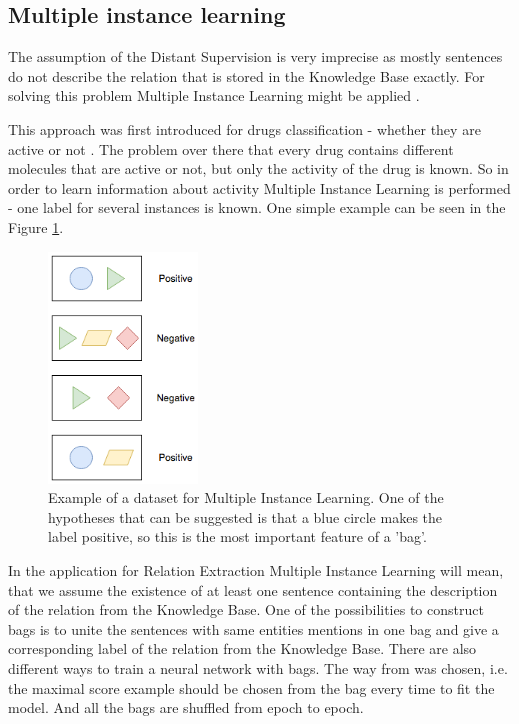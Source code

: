 \subsection{Multiple instance learning}
\label{subs:mil}
The assumption of the Distant Supervision is very imprecise as mostly sentences do not 
describe the relation that is stored in the Knowledge Base exactly. For solving this problem Multiple Instance Learning might be applied \cite{zeng2015distant}. 

This approach was first introduced for drugs classification - whether they are active or not 
\cite{dietterich1997solving}. The problem over there that every drug contains different 
molecules that are active or not, but only the activity of the drug is known. So in order to learn 
information about activity Multiple Instance Learning is performed - one label for several instances is 
known. One simple example can be seen in the Figure \ref{fig:mult-inst-learn}.

	\begin{figure}
		\centering
		\includegraphics[width=150px]{chapter3_approach/images/mult-inst-learn.png}
		\caption[Multiple Instance Learning example]{Example of a dataset for Multiple Instance Learning. One of the hypotheses that can be suggested is that a blue circle makes the label positive, so this is the most important feature of a 'bag'.}
		\label{fig:mult-inst-learn}
	\end{figure}
	
In the application for Relation Extraction Multiple Instance Learning will mean, that we assume the
existence of at least one sentence containing the description of the relation from the 
Knowledge Base. One of the possibilities to construct bags is to unite the sentences with same entities mentions in one bag and give 
a corresponding label of the relation from the Knowledge Base. There are also different ways to train a neural
network with bags. The way from \cite{ramon2000multi} was chosen, i.e. the maximal score example should be chosen from the bag every 
time to fit the model. And all the bags are shuffled from epoch to epoch.


